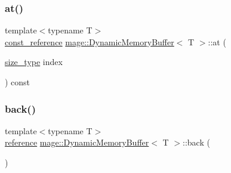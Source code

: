 \mbox{\label{classmage_1_1_dynamic_memory_buffer_a7ca5d05318bdc99d8f6df465bbdbd517}} 
\subsubsection{\texorpdfstring{at()}{at()}\hspace{0.1cm}{\footnotesize\ttfamily [2/2]}}
{\footnotesize\ttfamily template$<$typename T$>$ \\
\mbox{\hyperlink{classmage_1_1_dynamic_memory_buffer_aa454489303e19392c54044d3b3ae67ad}{const\+\_\+reference}} \mbox{\hyperlink{classmage_1_1_dynamic_memory_buffer}{mage\+::\+Dynamic\+Memory\+Buffer}}$<$ T $>$\+::at (\begin{DoxyParamCaption}\item[{\mbox{\hyperlink{classmage_1_1_dynamic_memory_buffer_a45d02825da2b18fd7c24965ed5f46a30}{size\+\_\+type}}}]{index }\end{DoxyParamCaption}) const}

\mbox{\label{classmage_1_1_dynamic_memory_buffer_a0b61ef41a8100874b1b468a90ffbf8dc}} 
\subsubsection{\texorpdfstring{back()}{back()}\hspace{0.1cm}{\footnotesize\ttfamily [1/2]}}
{\footnotesize\ttfamily template$<$typename T$>$ \\
\mbox{\hyperlink{classmage_1_1_dynamic_memory_buffer_a146681be5119c0329409436506334f05}{reference}} \mbox{\hyperlink{classmage_1_1_dynamic_memory_buffer}{mage\+::\+Dynamic\+Memory\+Buffer}}$<$ T $>$\+::back (\begin{DoxyParamCaption}{ }\end{DoxyParamCaption})\hspace{0.3cm}{\ttfamily [noexcept]}}

\mbox{\label{classmage_1_1_dynamic_memory_buffer_aba5cd4d73fa6ef09704ff3fcd6e29161}} 
